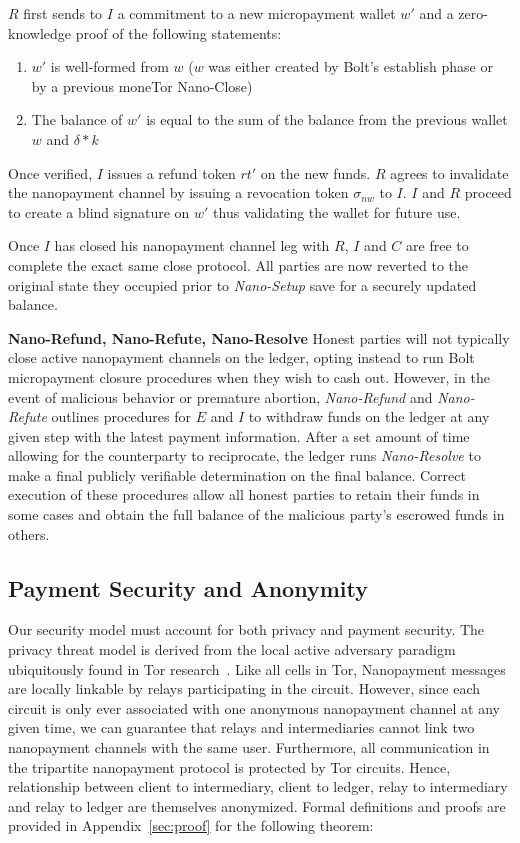 $R$ first sends to $I$ a commitment to a new micropayment wallet $w'$ and a
zero-knowledge proof of the following statements:

\begin{enumerate}
\item $w'$ is well-formed from $w$ ($w$ was either created by Bolt's establish
  phase or by a previous moneTor Nano-Close)
\item The balance of $w'$ is equal to the sum of the balance from the previous
  wallet $w$ and $\delta * k$
\end{enumerate}

Once verified, $I$ issues a refund token $rt'$ on the new funds. $R$ agrees to
invalidate the nanopayment channel by issuing a revocation token $\sigma_{nw}$
to $I$. $I$ and $R$ proceed to create a blind signature on $w'$ thus validating
the wallet for future use.

Once $I$ has closed his nanopayment channel leg with $R$, $I$ and $C$ are free
to complete the exact same close protocol. All parties are now reverted to the
original state they occupied prior to \emph{Nano-Setup} save for a securely
updated balance.

\textbf{Nano-Refund, Nano-Refute, Nano-Resolve} Honest parties will not
typically close active nanopayment channels on the ledger, opting instead to run
Bolt micropayment closure procedures when they wish to cash out. However, in the
event of malicious behavior or premature abortion, \emph{Nano-Refund} and
\emph{Nano-Refute} outlines procedures for $E$ and $I$ to withdraw funds on the
ledger at any given step with the latest payment information. After a set amount
of time allowing for the counterparty to reciprocate, the ledger runs
\emph{Nano-Resolve} to make a final publicly verifiable determination on the
final balance. Correct execution of these procedures allow all honest parties to
retain their funds in some cases and obtain the full balance of the malicious
party's escrowed funds in others.

\subsection{Payment Security and Anonymity}
\label{subsec:paysecurity}
Our security model must account for both privacy and payment security. The
privacy threat model is derived from the local active adversary paradigm
ubiquitously found in Tor research~\cite{dingledine2004tor}. Like all cells in
Tor, Nanopayment messages are locally linkable by relays participating in the
circuit. However, since each circuit is only ever associated with one anonymous
nanopayment channel at any given time, we can guarantee that relays and
intermediaries cannot link two nanopayment channels with the same user.
Furthermore, all communication in the tripartite nanopayment protocol is
protected by Tor circuits. Hence, relationship between client to intermediary,
client to ledger, relay to intermediary and relay to ledger are themselves
anonymized. Formal definitions and proofs are provided in
Appendix~\ref{sec:proof} for the following theorem:

